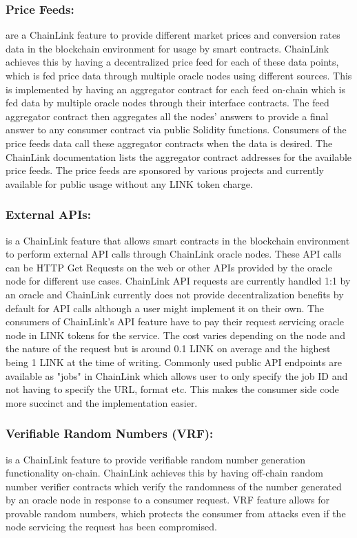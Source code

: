 \documentclass[runningheads]{llncs}
\begin{document}
\subsubsection{Price Feeds:} are a ChainLink feature to provide different market prices and conversion rates data in the blockchain environment for usage by smart contracts. ChainLink achieves this by having a decentralized price feed for each of these data points, which is fed price data through multiple oracle nodes using different sources. This is implemented by having an aggregator contract for each feed on-chain which is fed data by multiple oracle nodes through their interface contracts. The feed aggregator contract then aggregates all the nodes' answers to provide a final answer to any consumer contract via public Solidity functions. Consumers of the price feeds data call these aggregator contracts when the data is desired. The ChainLink documentation lists the aggregator contract addresses for the available price feeds\cite{chainlinkPriceFeeds}. The price feeds are sponsored by various projects and currently available for public usage without any LINK token charge.
\subsubsection{External APIs:} is a ChainLink feature that allows smart contracts in the blockchain environment to perform external API calls through ChainLink oracle nodes. These API calls can be HTTP Get Requests on the web or other APIs provided by the oracle node for different use cases. ChainLink API requests are currently handled 1:1 by an oracle and ChainLink currently does not provide decentralization benefits by default for API calls although a user might implement it on their own. The consumers of ChainLink's API feature have to pay their request servicing oracle node in LINK tokens for the service. The cost varies depending on the node and the nature of the request but is around 0.1 LINK on average and the highest being 1 LINK at the time of writing. Commonly used public API endpoints are available as "jobs" in ChainLink which allows user to only specify the job ID and not having to specify the URL, format etc. This makes the consumer side code more succinct and the implementation easier.
\subsubsection{Verifiable Random Numbers (VRF):} is a ChainLink feature to provide verifiable random number generation functionality on-chain. ChainLink achieves this by having off-chain random number verifier contracts which verify the randomness of the number generated by an oracle node in response to a consumer request. VRF feature allows for provable random numbers, which protects the consumer from attacks even if the node servicing the request has been compromised.
\end{document}
